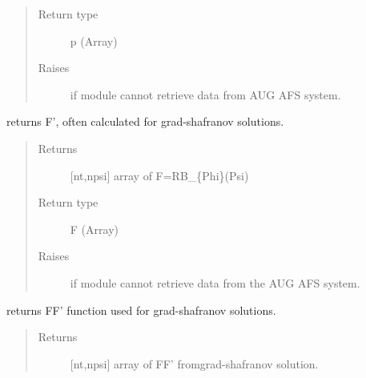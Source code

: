 \documentclass[letterpaper,10pt,english]{sphinxmanual}
\begin{document}
\begin{fulllineitems}
\begin{fulllineitems}
\begin{quote}
\begin{description}
\item[{Return type}] \leavevmode
p (Array)

\item[{Raises}] \leavevmode
{} \textendash{} if module cannot retrieve data from AUG AFS system.

\end{description}\end{quote}

\end{fulllineitems}


\begin{fulllineitems}
\label{\detokenize{eqtools:eqtools.AUGData.AUGDDData.getFPrime}}
returns F’, often calculated for grad-shafranov
solutions.
\begin{quote}\begin{description}
\item[{Returns}] \leavevmode
{[}nt,npsi{]} array of F=RB\_\{Phi\}(Psi)

\item[{Return type}] \leavevmode
F (Array)

\item[{Raises}] \leavevmode
{} \textendash{} if module cannot retrieve data from the AUG AFS system.

\end{description}\end{quote}

\end{fulllineitems}


\begin{fulllineitems}
\label{\detokenize{eqtools:eqtools.AUGData.AUGDDData.getFFPrime}}
returns FF’ function used for grad-shafranov solutions.
\begin{quote}\begin{description}
\item[{Returns}] \leavevmode
{[}nt,npsi{]} array of FF’ fromgrad-shafranov solution.


\end{description}
\end{quote}
\end{fulllineitems}
\end{fulllineitems}
\end{document}
